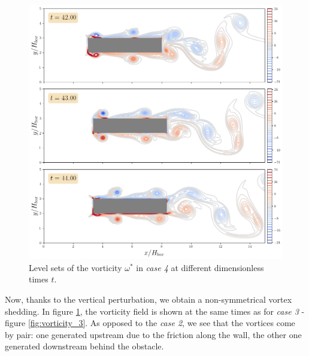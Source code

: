 \documentclass[11 pt]{article}
\begin{document}
\begin{figure}[H]
    \centering
    \includegraphics[width=\textwidth]{../figures/vorticity_case_4_part1.png}
    \caption{Level sets of the vorticity $\omega^*$ in \textit{case 4} at different dimensionless times $t$.}
    \label{fig:vorticity_4a}
\end{figure}

Now, thanks to the vertical perturbation, we obtain a non-symmetrical vortex shedding. In figure \ref{fig:vorticity_4a}, the vorticity field is shown at the same times as for \textit{case 3} - figure \ref{fig:vorticity_3}. As opposed to the \textit{case 2}, we see that the vortices come by pair: one generated upstream due to the friction along the wall, the other one generated downstream behind the obstacle. 
\end{document}
